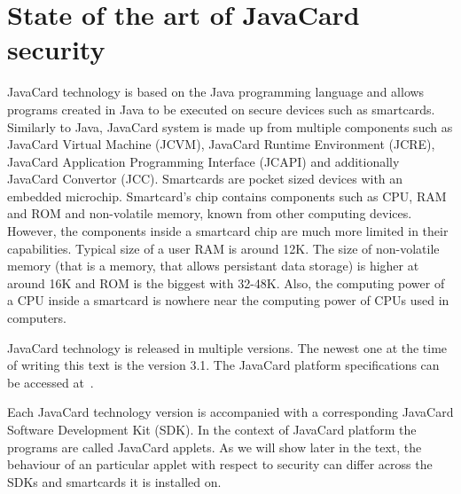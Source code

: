 \documentclass{../llncs/llncs}
\begin{document}
\section{State of the art of JavaCard security\label{sec:state-of-the-art}}
JavaCard technology is based on the Java programming language and allows programs created in Java to be executed on secure devices such as smartcards. Similarly to Java, JavaCard system is made up from multiple components such as JavaCard Virtual Machine (JCVM), JavaCard Runtime Environment (JCRE), JavaCard Application Programming Interface (JCAPI) and additionally JavaCard Convertor (JCC).  Smartcards are pocket sized devices with an embedded microchip. Smartcard's chip contains components such as CPU, RAM and ROM and non-volatile memory, known from other computing devices. However, the components inside a smartcard chip are much more limited in their capabilities. Typical size of a user RAM is around 12K. The size of non-volatile memory (that is a memory, that allows persistant data storage) is higher at around 16K and ROM is the biggest with 32-48K. Also, the computing power of a CPU inside a smartcard is nowhere near the computing power of CPUs used in computers.

JavaCard technology is released in multiple versions. The newest one at the time of writing this text is the version 3.1. The JavaCard platform specifications can be accessed at~\cite{jcspecs31download}.


Each JavaCard technology version is accompanied with a corresponding JavaCard Software Development Kit (SDK).
In the context of JavaCard platform the programs are called JavaCard applets. As we will show later in the text, the behaviour of an particular applet with respect to security can differ across the SDKs and smartcards it is installed on.
\end{document}
